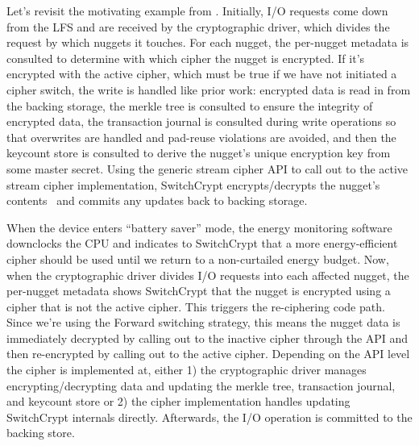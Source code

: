 Let's revisit the motivating example from . Initially, I/O
requests come down from the LFS and are received by the cryptographic driver,
which divides the request by which nuggets it touches. For each nugget, the
per-nugget metadata is consulted to determine with which cipher the nugget is
encrypted. If it's encrypted with the active cipher, which must be true if we
have not initiated a cipher switch, the write is handled like prior work:
encrypted data is read in from the backing storage, the merkle tree is consulted
to ensure the integrity of encrypted data, the transaction journal is consulted
during write operations so that overwrites are handled and pad-reuse violations
are avoided, and then the keycount store is consulted to derive the nugget's
unique encryption key from some master secret. Using the generic stream cipher
API to call out to the active stream cipher implementation, SwitchCrypt
encrypts/decrypts the nugget's contents~\cite{StrongBox} and commits any updates
back to backing storage.

When the device enters ``battery saver'' mode, the energy monitoring software
downclocks the CPU and indicates to SwitchCrypt that a more energy-efficient
cipher should be used until we return to a non-curtailed energy budget. Now,
when the cryptographic driver divides I/O requests into each affected nugget,
the per-nugget metadata shows SwitchCrypt that the nugget is encrypted using a
cipher that is not the active cipher. This triggers the re-ciphering code path.
Since we're using the Forward switching strategy, this means the nugget data is
immediately decrypted by calling out to the inactive cipher through the API and
then re-encrypted by calling out to the active cipher. Depending on the API
level the cipher is implemented at, either 1) the cryptographic driver manages
encrypting/decrypting data and updating the merkle tree, transaction journal,
and keycount store or 2) the cipher implementation handles updating SwitchCrypt
internals directly. Afterwards, the I/O operation is committed to the backing
store.
